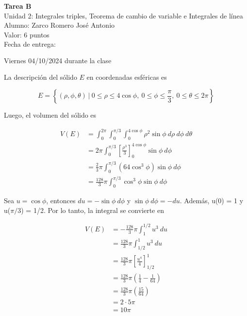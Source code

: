 \documentclass[12pt]{exam}
\begin{document}
\centering

\Large 
\textbf{Tarea B}\\
\large 
Unidad 2: Integrales triples, Teorema de cambio de variable e Integrales de línea \\
Alumno: Zarco Romero José Antonio\\
Valor: 6 puntos\\
\normalsize
Fecha de entrega: 

Viernes 04/10/2024 durante la clase

\vskip10pt

\normalsize

\pointformat{\bfseries\boldmath(\thepoints)}
\vskip10pt

\begin{questions}


  La descripción del sólido $E$ en coordenadas esféricas es

  \[
  E = \left\{(\rho, \phi, \theta)~|~0 \leq \rho \leq 4\cos{\phi},~0 \leq \phi \leq \frac{\pi}{3},~0 \leq \theta \leq 2\pi\right\}
  \]

  Luego, el volumen del sólido es

  \begin{align*}
    V(E) 
    &= \int_{0}^{2\pi}\int_{0}^{\pi/3}\int_{0}^{4\cos{\phi}}\rho^2\sin{\phi}~d\rho~d\phi~d\theta\\
    &= 2 \pi \int_{0}^{\pi/3}\left[\frac{\rho^3}{3}\right]_{0}^{4\cos{\phi}}\sin{\phi}~d\phi\\
    &= \frac{2}{3} \pi \int_{0}^{\pi/3}(64\cos^3{\phi})\sin{\phi}~d\phi\\
    &= \frac{128}{3} \pi \int_{0}^{\pi/3}\cos^3{\phi}\sin{\phi}~d\phi
  \end{align*}

  Sea $u = \cos{\phi}$, entonces $du = -\sin{\phi}~d\phi$ y $\sin{\phi}~d\phi = -du$. Además, u(0) = 1 y u($\pi/3$) = 1/2. Por lo tanto, la integral se convierte en

  \begin{align*}
    V(E)
    &= -\frac{128}{3} \pi \int_{1}^{1/2}u^3~du\\
    &= \frac{128}{3} \pi \int_{1/2}^{1}u^3~du\\
    &= \frac{128}{3} \pi \left[\frac{u^4}{4}\right]_{1/2}^{1}\\
    &= \frac{128}{3} \pi \left(\frac{1}{4} - \frac{1}{64}\right)\\
    &= \frac{128}{3} \pi \left(\frac{15}{64}\right)\\
    &= 2 \cdot 5 \pi\\
    &= 10 \pi
  \end{align*}


\end{questions}
\end{document}
